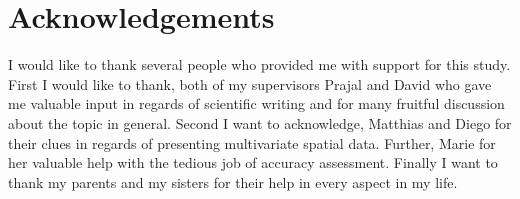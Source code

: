 \chapter*{Acknowledgements}
\label{ch:acknow}
	I would like to thank several people who provided me with support for this study. First I would like to thank, both of my supervisors Prajal and David who gave me valuable input in regards of scientific writing and for many fruitful discussion about the topic in general. Second I want to acknowledge, Matthias and Diego for their clues in regards of presenting multivariate spatial data. Further, Marie for her valuable help with the tedious job of accuracy assessment. Finally I want to thank my parents and my sisters for their help in every aspect in my life.